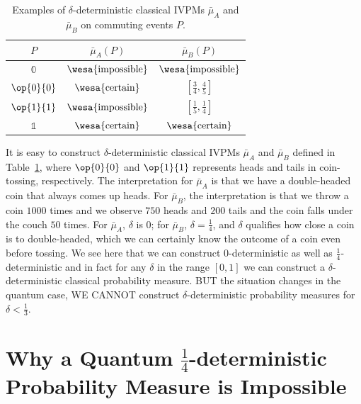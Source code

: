 \documentclass[english,reprint, aps, prl,superscriptaddress, showpacs,
showkeys, longbibliography, amsmath, amssymb, floatfix]{revtex4-1}
\theoremstyle{plain}
\theoremstyle{definition}
\newcommand{\imposs}{{\text{\wesa{impossible}}}}
\newcommand{\necess}{{\text{\wesa{certain}}}}
\newcommand{\proj}[1]{\op{#1}{#1}}
\begin{document}
\begin{table}
\noindent \centering{}\caption{\label{tab:classical-IVPMs}Examples of $\delta$-deterministic classical
IVPMs $\bar{\mu}_{A}$ and $\bar{\mu}_{B}$ on commuting events $P$.}
\begin{tabular}{ccc}
\toprule 
\addlinespace
$P$  & $\bar{\mu}_{A}(P)$  & $\bar{\mu}_{B}(P)$ \tabularnewline
\midrule
\midrule 
\addlinespace
$\mathbb{0}$  & $\imposs$  & $\imposs$ \tabularnewline
\midrule 
\addlinespace
$\proj{0}$  & $\necess$  & $\left[\frac{3}{4},\frac{4}{5}\right]$ \tabularnewline
\midrule 
\addlinespace
$\proj{1}$  & $\imposs$  & $\left[\frac{1}{5},\frac{1}{4}\right]$ \tabularnewline
\midrule 
\addlinespace
$\mathbb{1}$  & $\necess$  & $\necess$ \tabularnewline
\bottomrule
\end{tabular}
\end{table}

\noindent It is easy to construct $\delta$-deterministic classical
IVPMs $\bar{\mu}_{A}$ and $\bar{\mu}_{B}$ defined in Table~\ref{tab:classical-IVPMs},
where $\proj{0}$ and $\proj{1}$ represents heads and tails in coin-tossing,
respectively. The interpretation for $\bar{\mu}_{A}$ is that we have
a double-headed coin that always comes up heads. For $\bar{\mu}_{B}$,
the interpretation is that we throw a coin $1000$ times and we observe
$750$ heads and $200$ tails and the coin falls under the couch $50$
times. For $\bar{\mu}_{A}$, $\delta$ is $0$; for $\bar{\mu}_{B}$,
$\delta=\frac{1}{4}$, and $\delta$ qualifies how close a coin is
to double-headed, which we can certainly know the outcome of a coin
even before tossing. We see here that we can construct $0$-deterministic
as well as $\frac{1}{4}$-deterministic and in fact for any $\delta$
in the range $\left[0,1\right]$ we can construct a $\delta$-deterministic
classical probability measure. BUT the situation changes in the quantum
case, WE CANNOT construct $\delta$-deterministic probability measures
for $\delta<\frac{1}{3}$.

\section{Why a Quantum \texorpdfstring{$\frac{1}{4}$}{¼}-deterministic Probability Measure is
Impossible}
\end{document}
